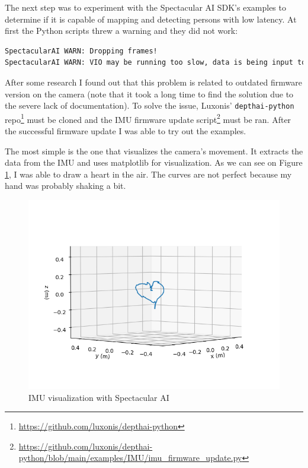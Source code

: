 The next step was to experiment with the Spectacular AI SDK's examples to determine if it is capable of mapping and detecting persons with low latency. At first the Python scripts threw a warning and they did not work: 
\FloatBarrier
\begin{lstlisting}[language=bash,frame=single,float=h]
SpectacularAI WARN: Dropping frames!
SpectacularAI WARN: VIO may be running too slow, data is being input too fast, or IMU samples are missing / time-offset from frames. (buffer size 10)
\end{lstlisting}
After some research I found out that this problem is related to outdated firmware version on the camera (note that it took a long time to find the solution due to the severe lack of documentation). To solve the issue, Luxonis' \verb|depthai-python| repo\footnote{\url{https://github.com/luxonis/depthai-python}} must be cloned and the IMU firmware update script\footnote{\url{https://github.com/luxonis/depthai-python/blob/main/examples/IMU/imu_firmware_update.py}} must be ran. After the successful firmware update I was able to try out the examples.

The most simple is the one that visualizes the camera's movement. It extracts the data from the IMU and uses matplotlib for visualization. As we can see on Figure \ref{fig:IMU_visu}, I was able to draw a heart in the air. The curves are not perfect because my hand was probably shaking a bit.

\begin{figure}[htbp]
	\centering
	\includegraphics[width=150mm, keepaspectratio]{figures/spectacular_ai_vio_visu.png}
	\caption{IMU visualization with Spectacular AI}
	\label{fig:IMU_visu}
\end{figure}

